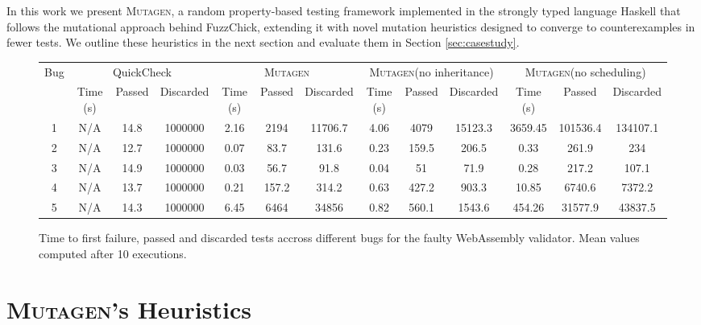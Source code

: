 \documentclass[10pt,conference]{IEEEtran}
\newcommand{\ourtool}{\textsc{Mutagen}\xspace}
\begin{document}
In this work we present \ourtool, a random property-based testing framework
implemented in the strongly typed language Haskell that follows the mutational
approach behind FuzzChick, extending it with novel mutation heuristics designed
to converge to counterexamples in fewer tests.
%
We outline these heuristics in the next section and evaluate them in Section
\ref{sec:casestudy}.


\begin{figure*}[t]
  \renewcommand{\figurename}{Table}
  \vspace{-10pt}
  \scriptsize
  \centering
    \begin{tabular}{|c|c|c|c|c|c|c|c|c|c|c|c|c|}
      \hline
      \multirow{2}{*}{Bug} &
      \multicolumn{3}{c|}{QuickCheck} &
      \multicolumn{3}{c|}{\ourtool} &
      \multicolumn{3}{c|}{\ourtool (no inheritance)} &
      \multicolumn{3}{c|}{\ourtool (no scheduling)}  \\
      \cline{2-13} &
      Time (s) & Passed & Discarded &
      Time (s) & Passed & Discarded &
      Time (s) & Passed & Discarded &
      Time (s) & Passed & Discarded \\
      \hline
      1 & N/A & 14.8 & 1000000 & 2.16 & 2194 & 11706.7 & 4.06 & 4079 & 15123.3 & 3659.45 & 101536.4 & 134107.1 \\
      \hline
      2 & N/A & 12.7 & 1000000 & 0.07 & 83.7  & 131.6 & 0.23 & 159.5 & 206.5 & 0.33 & 261.9 & 234 \\
      \hline
      3 & N/A & 14.9 & 1000000 & 0.03 & 56.7 & 91.8 & 0.04 & 51 & 71.9 & 0.28 & 217.2 & 107.1 \\
      \hline
      4 & N/A & 13.7 & 1000000 & 0.21 & 157.2 & 314.2 & 0.63 & 427.2 & 903.3 & 10.85 & 6740.6 & 7372.2 \\
      \hline
      5 & N/A & 14.3 & 1000000 & 6.45 & 6464 & 34856 & 0.82 & 560.1  & 1543.6 & 454.26 & 31577.9 & 43837.5 \\
      \hline
    \end{tabular}
    \vspace{-2pt}
    \caption{\label{fig:results} Time to first failure, passed and discarded
      tests accross different bugs for the faulty WebAssembly validator. Mean values computed after 10 executions.}
  \vspace{-15pt}
\end{figure*}


\section{\ourtool's Heuristics}
\label{sec:heuristics}
\end{document}
